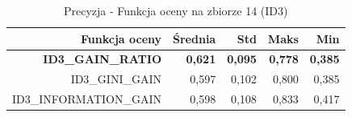\begin{table}[htbp]
\centering
\small
\setlength{\tabcolsep}{6pt}
\renewcommand{\arraystretch}{1.2}
\caption{Precyzja - Funkcja oceny na zbiorze 14 (ID3)}
\label{tab:ID3_eval_function_14_precision}
\begin{tabular}{r|r|r|r|r}
\toprule
Funkcja oceny & Średnia & Std & Maks & Min \\
\hline
\textbf{ID3\_GAIN\_RATIO} & \textbf{0,621} & \textbf{0,095} & \textbf{0,778} & \textbf{0,385} \\
ID3\_GINI\_GAIN & 0,597 & 0,102 & 0,800 & 0,385 \\
ID3\_INFORMATION\_GAIN & 0,598 & 0,108 & 0,833 & 0,417 \\
\bottomrule
\end{tabular}
\end{table}